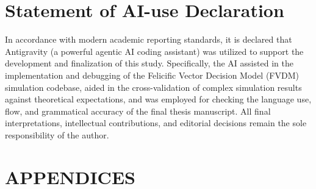 \documentclass{icsthesis}
\begin{document}
\begin{mainmatter}
\section{Statement of AI-use Declaration}
In accordance with modern academic reporting standards, it is declared that Antigravity (a powerful agentic AI coding assistant) was utilized to support the development and finalization of this study. Specifically, the AI assisted in the implementation and debugging of the Felicific Vector Decision Model (FVDM) simulation codebase, aided in the cross-validation of complex simulation results against theoretical expectations, and was employed for checking the language use, flow, and grammatical accuracy of the final thesis manuscript. All final interpretations, intellectual contributions, and editorial decisions remain the sole responsibility of the author.

		\nocite{*}
			
	\clearpage
\appendix
\section*{APPENDICES}

\end{mainmatter}
\end{document}
